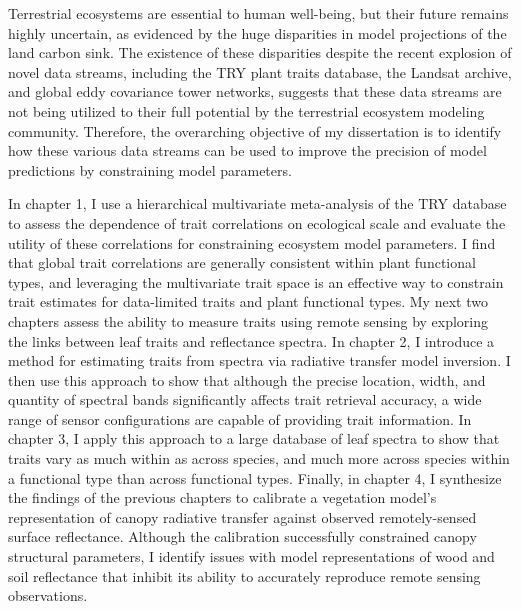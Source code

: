 
Terrestrial ecosystems are essential to human well-being, but their future remains highly uncertain, as evidenced by the huge disparities in model projections of the land carbon sink.
The existence of these disparities despite the recent explosion of novel data streams, including the TRY plant traits database, the Landsat archive, and global eddy covariance tower networks, suggests that these data streams are not being utilized to their full potential by the terrestrial ecosystem modeling community.
Therefore, the overarching objective of my dissertation is to identify how these various data streams can be used to improve the precision of model predictions by constraining model parameters.

In chapter 1, I use a hierarchical multivariate meta-analysis of the TRY database to assess the dependence of trait correlations on ecological scale and evaluate the utility of these correlations for constraining ecosystem model parameters.
I find that global trait correlations are generally consistent within plant functional types, and leveraging the multivariate trait space is an effective way to constrain trait estimates for data-limited traits and plant functional types.
My next two chapters assess the ability to measure traits using remote sensing by exploring the links between leaf traits and reflectance spectra.
In chapter 2, I introduce a method for estimating traits from spectra via radiative transfer model inversion.
I then use this approach to show that although the precise location, width, and quantity of spectral bands significantly affects trait retrieval accuracy, a wide range of sensor configurations are capable of providing trait information.
In chapter 3, I apply this approach to a large database of leaf spectra to show that traits vary as much within as across species, and much more across species within a functional type than across functional types.
Finally, in chapter 4, I synthesize the findings of the previous chapters to calibrate a vegetation model's representation of canopy radiative transfer against observed remotely-sensed surface reflectance.
Although the calibration successfully constrained canopy structural parameters, I identify issues with model representations of wood and soil reflectance that inhibit its ability to accurately reproduce remote sensing observations.

